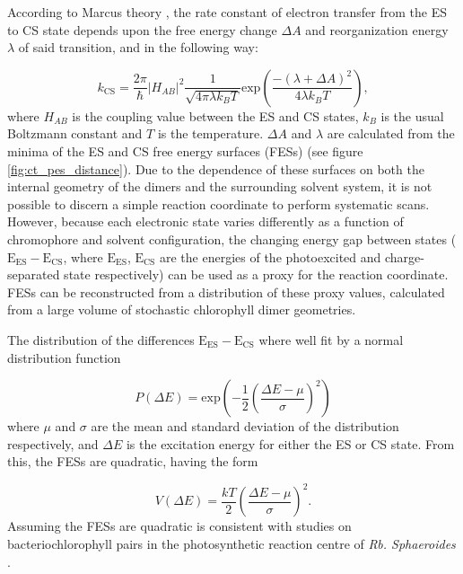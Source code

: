 According to Marcus theory \cite{Marcus1964}, the rate constant of electron transfer
from the ES to CS state depends upon the free energy change $\Delta A$ and reorganization 
energy $\lambda$ of said transition, and in the following way:

\begin{equation}
    k_{\text{CS}} = \frac{2\pi}{\hbar} \left\lvert H_{AB} \right\rvert^2 \frac{1}{\sqrt{4 \pi \lambda k_B T}}\text{exp}\left(\frac{-\left(\lambda + \Delta A\right)^2}{4 \lambda k_B T}\right),
\end{equation}
%
where $H_{AB}$ is the coupling value between the ES and CS states, $k_B$ is the 
usual Boltzmann constant and $T$ is the temperature. $\Delta A$ and $\lambda$ are
calculated from the minima of the ES and CS free energy surfaces (FESs) (see figure
\ref{fig:ct_pes_distance}). Due to the dependence of these surfaces on both the 
internal geometry of the dimers and the surrounding solvent system, it is not possible
to discern a simple reaction  coordinate to perform systematic scans. However, because
each electronic state varies differently as a function of chromophore and solvent 
configuration, the changing energy gap between states ($\mathrm{E}_\mathrm{ES}-\mathrm{E}_\mathrm{CS}$,
where $\mathrm{E}_\mathrm{ES}$, $\mathrm{E}_\mathrm{CS}$ are the energies of the
photoexcited and charge-separated state respectively) can be used as a proxy for 
the reaction coordinate. FESs can be reconstructed from a distribution of these
proxy values, calculated from a large volume of stochastic chlorophyll dimer geometries.

The distribution of the differences $\mathrm{E}_\mathrm{ES}-\mathrm{E}_\mathrm{CS}$
where well fit by a normal distribution function

\begin{equation}
    P\left(\Delta E\right) = \text{exp} \left(-\frac{1}{2}\left(\frac{\Delta E - \mu}{\sigma}\right)^2\right)
    \label{eq:FES_normdist}
\end{equation}
%
where $\mu$ and $\sigma$ are the mean and standard deviation of the distribution
respectively, and $\Delta E$ is the excitation energy for either the ES or CS state.
From this, the FESs are quadratic, having the form

\begin{equation}
    V\left(\Delta E\right) = \frac{kT}{2} \left( \frac{\Delta E - \mu}{\sigma}\right)^2.
\end{equation}
%
Assuming the FESs are quadratic is consistent with studies on bacteriochlorophyll 
pairs in the photosynthetic reaction centre of \emph{Rb. Sphaeroides} \cite{Warshel2001}.


